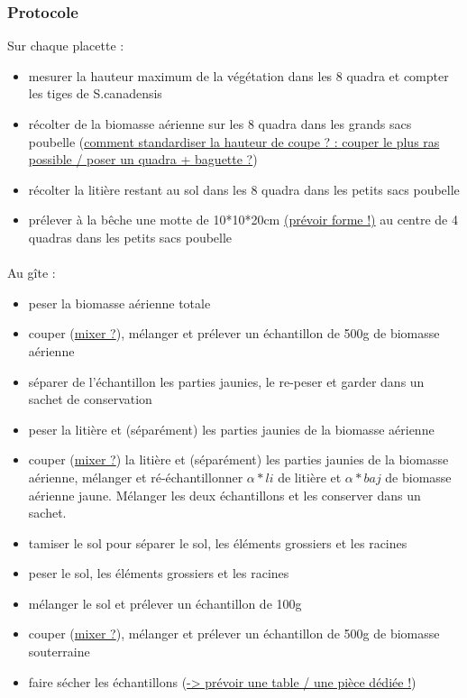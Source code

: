 \documentclass{article}
\begin{document}
	\subsubsection{Protocole}
	Sur chaque placette :
	\begin{itemize}
		\item mesurer la hauteur maximum de la végétation dans les 8 quadra et compter les tiges de S.canadensis
		\item récolter de la biomasse aérienne sur les 8 quadra dans les grands sacs poubelle (\underline{comment standardiser la hauteur de coupe ? : couper le plus ras possible / poser un quadra + baguette ?})
		\item récolter la litière restant au sol dans les 8 quadra dans les petits sacs poubelle
		\item prélever à la bêche une motte de 10*10*20cm \underline{(prévoir forme !)} au centre de 4 quadras dans les petits sacs poubelle
	\end{itemize}

	\paragraph{} Au gîte :
	\begin{itemize}
		\item peser la biomasse aérienne totale
		\item couper (\underline{mixer ?}), mélanger et  prélever un échantillon de 500g de biomasse aérienne 
		\item séparer de l'échantillon les parties jaunies, le re-peser et garder dans un sachet de conservation
		\item peser la litière et (séparément) les parties jaunies de la biomasse aérienne
		\item couper (\underline{mixer ?}) la litière et (séparément) les parties jaunies de la biomasse aérienne, mélanger et ré-échantillonner $\alpha * li$ de litière et $\alpha * baj$ de biomasse aérienne jaune. Mélanger les deux échantillons et les conserver dans un sachet.
		\item tamiser le sol pour séparer le sol, les éléments grossiers et les racines
		\item peser le sol, les éléments grossiers et les racines
		\item mélanger le sol et prélever un échantillon de 100g
		\item couper (\underline{mixer ?}), mélanger et  prélever un échantillon de 500g de biomasse souterraine
		\item faire sécher les échantillons (\underline{-> prévoir une table / une pièce dédiée !})
	\end{itemize}
 
\end{document}
